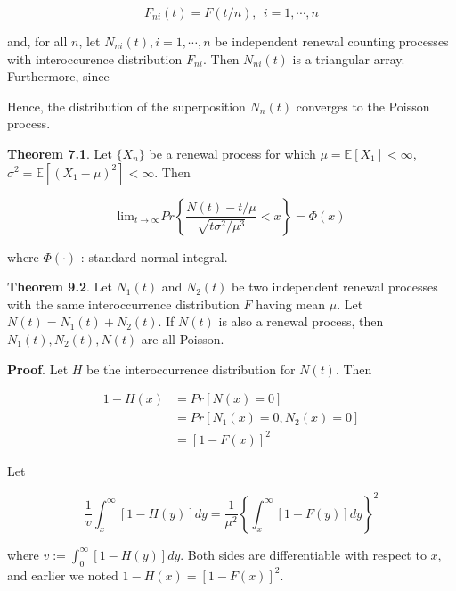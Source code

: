 \documentclass[12pt]{article}
\theoremstyle{nonumberbreak}
\begin{document}
$$
F_{ni}(t) = F(t/n), \ \ i=1,\cdots,n
$$

and, for all $n$, let $N_{ni} (t), i=1,\cdots,n$ be independent renewal counting processes with interoccurence distribution $F_{ni}$. Then $N_{ni} (t)$ is a triangular array. Furthermore, since 




Hence, the distribution of the superposition $N_n(t)$ converges to the Poisson process. 



\begin{theorem}
\textbf{Theorem 7.1}. Let $\{  X_n \}$ be a renewal process for which $\mu = \mathbb{E} [ X_1] < \infty$, $\sigma^2 = \mathbb{E}\left[ (X_1 - \mu)^2 \right] < \infty$. Then 

$$
\mathrm{lim}_{t\to\infty} Pr \left\{ \frac{N(t)-t/\mu}{\sqrt{t\sigma^2/\mu^3}} < x \right\} = \Phi(x)
$$

where $\Phi(\cdot)$ : standard normal integral.
\end{theorem}





\begin{theorem}
\textbf{Theorem 9.2}. Let $N_1(t)$ and $N_2(t)$ be two independent renewal processes with the same interoccurrence distribution $F$ having mean $\mu$. Let $N(t) = N_1(t) + N_2(t)$. If $N(t)$ is also a renewal process, then $N_1(t), N_2(t), N(t)$ are all Poisson.
\end{theorem}


\textbf{Proof}. Let $H$ be the interoccurrence distribution for $N(t)$. Then 

$$
\begin{aligned}
1 - H(x) &= Pr[N(x) = 0] \\[8pt]
&= Pr[N_1(x)=0, N_2(x)=0] \\[8pt]
&= [1-F(x)]^2
\end{aligned}
$$

Let 



$$
\frac{1}{v} \int_x^\infty [1-H(y)]dy = \frac{1}{\mu^2} \left\{ \int_x^\infty [1-F(y)] dy \right\}^2
$$

where $v := \int_0^\infty [1-H(y)] dy$. Both sides are differentiable with respect to $x$, and earlier we noted $1-H(x) = [1-F(x)]^2$.  
\end{document}

